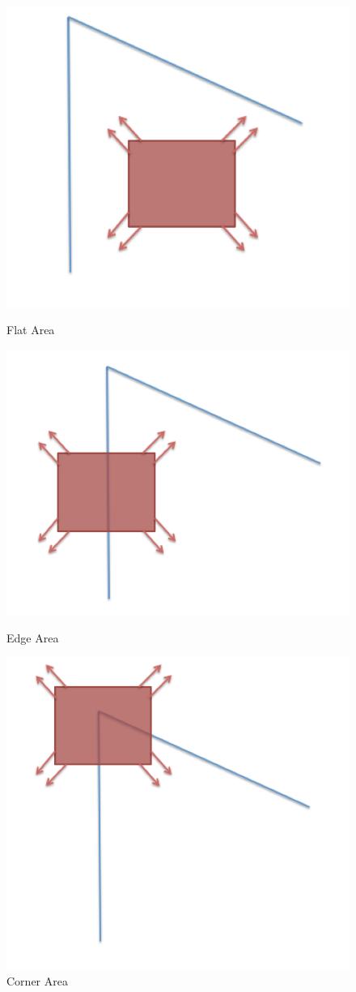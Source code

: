  \begin{figure}[ht!]
\centering
\begin{minipage}{.5\textwidth}
	\centering
	\includegraphics[width=.6\linewidth]{images/flatArea.png}
	\caption{Flat Area}
	\label{fig:flatArea}
\end{minipage}%
\begin{minipage}{.5\textwidth}
	\centering
	\includegraphics[width=.6\linewidth]{images/edgeArea.png}
	\caption{Edge Area}
	\label{fig:edgeArea}
\end{minipage}
\begin{minipage}{.5\textwidth}
	\centering
	\includegraphics[width=.6\linewidth]{images/cornerArea.png}
	\caption{Corner Area}
	\label{fig:cornerArea}
\end{minipage}
\end{figure}


